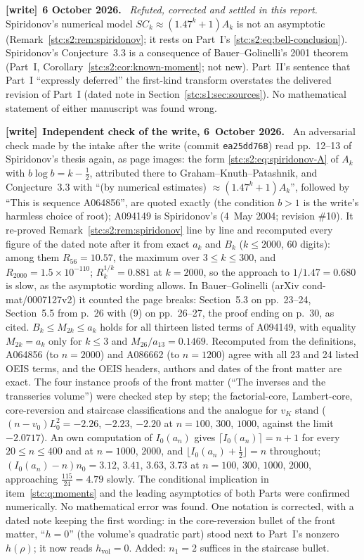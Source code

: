 \documentclass[11pt,letterpaper]{article}
\numberwithin{equation}{section}
\theoremstyle{remark}\newtheorem{remark}[theorem]{Remark}
\newcommand{\file}[1]{\nolinkurl{#1}}
\newenvironment{writenote}[1][]{\par\smallskip\begingroup\small
 \noindent\textbf{[write]}\if\relax\detokenize{#1}\relax\else~\textbf{#1.}\fi\ }%
 {\par\endgroup\smallskip}
\begin{document}
\begin{writenote}[6 October 2026]
\emph{Refuted, corrected and settled in this report.} Spiridonov's numerical model $SC_k\approx(1.47^k+1)A_k$ is not an asymptotic (Remark~\ref{stc:s2:rem:spiridonov}; it rests on Part~I's \eqref{stc:s2:eq:bell-conclusion}). Spiridonov's Conjecture~3.3 is a consequence of Bauer--Golinelli's 2001 theorem (Part~I, Corollary~\ref{stc:s2:cor:known-moment}; not new). Part~II's sentence that Part~I ``expressly deferred'' the first-kind transform overstates the delivered revision of Part~I (dated note in Section~\ref{stc:s1:sec:sources}). No mathematical statement of either manuscript was found wrong.
\end{writenote}
\begin{writenote}[Independent check of the write, 6~October 2026]
An adversarial check made by the intake after the write (commit \file{ea25dd768}) read pp.~12--13 of Spiridonov's thesis \cite{spiridonov} again, as page images: the form \eqref{stc:s2:eq:spiridonov-A} of $A_k$ with $b\log b=k-\frac12$, attributed there to Graham--Knuth--Patashnik, and Conjecture~3.3 with ``(by numerical estimates) $\approx(1.47^k+1)A_k$'', followed by ``This is sequence A064856'', are quoted exactly (the condition $b>1$ is the write's harmless choice of root); A094149 is Spiridonov's (4~May 2004; revision \#10). It re-proved Remark~\ref{stc:s2:rem:spiridonov} line by line and recomputed every figure of the dated note after it from exact $a_k$ and $B_k$ ($k\le2000$, 60 digits): among them $R_{56}=10.57$, the maximum over $3\le k\le300$, and $R_{2000}=1.5\times10^{-110}$; $R_k^{1/k}=0.881$ at $k=2000$, so the approach to $1/1.47=0.680$ is slow, as the asymptotic wording allows. In Bauer--Golinelli (arXiv cond-mat/0007127v2) it counted the page breaks: Section~5.3 on pp.~23--24, Section~5.5 from p.~26 with (9) on pp.~26--27, the proof ending on p.~30, as cited. $B_k\le M_{2k}\le a_k$ holds for all thirteen listed terms of A094149, with equality $M_{2k}=a_k$ only for $k\le3$ and $M_{26}/a_{13}=0.1469$. Recomputed from the definitions, A064856 (to $n=2000$) and A086662 (to $n=1200$) agree with all 23 and 24 listed OEIS terms, and the OEIS headers, authors and dates of the front matter are exact. The four instance proofs of the front matter (``The inverses and the transseries volume'') were checked step by step; the factorial-core, Lambert-core, core-reversion and staircase classifications and the analogue for $v_K$ stand ($(n-v_0)L_0^2=-2.26$, $-2.23$, $-2.20$ at $n=100$, $300$, $1000$, against the limit $-2.0717$). An own computation of $I_0(a_n)$ gives $\lceil I_0(a_n)\rceil=n+1$ for every $20\le n\le400$ and at $n=1000$, $2000$, and $\lfloor I_0(a_n)+\frac12\rfloor=n$ throughout; $(I_0(a_n)-n)n_0=3.12$, $3.41$, $3.63$, $3.73$ at $n=100$, $300$, $1000$, $2000$, approaching $\frac{115}{24}=4.79$ slowly. The conditional implication in item~\ref{stc:q:moments} and the leading asymptotics of both Parts were confirmed numerically. No mathematical error was found. One notation is corrected, with a dated note keeping the first wording: in the core-reversion bullet of the front matter, ``$h=0$'' (the volume's quadratic part) stood next to Part~I's nonzero $h(\rho)$; it now reads $h_{\mathrm{vol}}=0$. Added: $n_1=2$ suffices in the staircase bullet.

\end{writenote}
\end{document}
